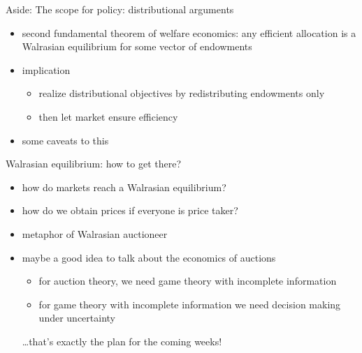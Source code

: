 \documentclass[bigger]{beamer}
\begin{document}
\begin{frame}[label={sec:orga1c95ac}]{Aside: The scope for policy: distributional arguments}
\begin{itemize}
\item second fundamental theorem of welfare economics:\linebreak
any efficient allocation is a Walrasian equilibrium for some vector of endowments
\item implication
\begin{itemize}
\item realize distributional objectives by redistributing endowments only
\item then let market ensure efficiency
\end{itemize}
\item some caveats to this
\end{itemize}
\end{frame}
\begin{frame}[label={sec:org2a74418}]{Walrasian equilibrium: how to get there?}
\begin{itemize}
\item how do markets reach a Walrasian equilibrium?
\item how do we obtain prices if everyone is price taker?
\item metaphor of Walrasian auctioneer
\vspace*{1cm}
\item maybe a good idea to talk about the economics of auctions
\begin{itemize}
\item for auction theory, we need game theory with incomplete information
\item for game theory with incomplete information we need decision making under uncertainty
\end{itemize}
\ldots{}that's exactly the plan for the coming weeks!
\end{itemize}
\end{frame}
\end{document}
